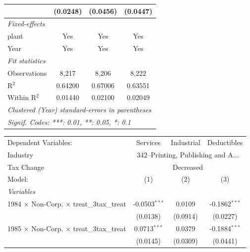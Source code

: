 \documentclass[
  12pt]{article}
\theoremstyle{definition}
\theoremstyle{remark}
\begin{document}
\begin{table}
\begin{minipage}{\linewidth}
\begin{tabular}{lccc}
                                                           & (0.0248)       & (0.0456)        & (0.0447)\\   
   \midrule
   \emph{Fixed-effects}\\
   plant                                                   & Yes            & Yes             & Yes\\  
   Year                                                    & Yes            & Yes             & Yes\\  
   \midrule
   \emph{Fit statistics}\\
   Observations                                            & 8,217          & 8,206           & 8,222\\  
   R$^2$                                                   & 0.64200        & 0.67006         & 0.63551\\  
   Within R$^2$                                            & 0.01440        & 0.02100         & 0.02049\\  
   \midrule \midrule
   \multicolumn{4}{l}{\emph{Clustered (Year) standard-errors in parentheses}}\\
   \multicolumn{4}{l}{\emph{Signif. Codes: ***: 0.01, **: 0.05, *: 0.1}}\\
\end{tabular}
\par\endgroup
\begingroup
\centering
\begin{tabular}{lccc}
   \tabularnewline \midrule \midrule
   Dependent Variables:                                    & Services        & Industrial     & Deductibles\\  
   Industry & \multicolumn{3}{c}{342–Printing, Publishing and A...} \\ 
   Tax Change & \multicolumn{3}{c}{Decreased} \\ 
   Model:                                                  & (1)             & (2)            & (3)\\  
   \midrule
   \emph{Variables}\\
   1984 $\times$ Non-Corp. $\times$ treat\_3tax\_treat     & -0.0503$^{***}$ & 0.0109         & -0.1862$^{***}$\\   
                                                           & (0.0138)        & (0.0914)       & (0.0227)\\   
   1985 $\times$ Non-Corp. $\times$ treat\_3tax\_treat     & 0.0713$^{***}$  & 0.0379         & -0.1884$^{***}$\\   
                                                           & (0.0145)        & (0.0309)       & (0.0441)\\   

\end{tabular}
\end{minipage}
\end{table}
\end{document}
